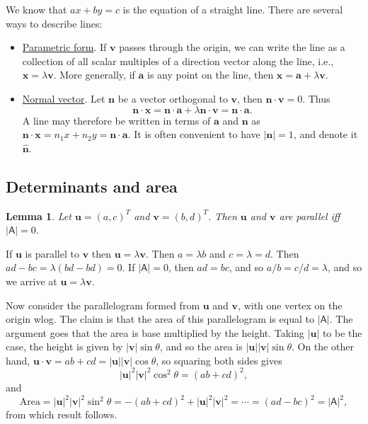 \documentclass[10pt,notitlepage]{revtex4-1}
\newtheorem{lemma}[theorem]{Lemma}
\newenvironment{proof}[1][Proof]{\begin{trivlist}
\item[\hskip \labelsep {\bfseries #1}]}{\end{trivlist}}
\newcommand{\xb}{\boldsymbol{x}}
\newcommand{\ub}{\boldsymbol{u}}
\newcommand{\vb}{\boldsymbol{v}}
\newcommand{\ab}{{\boldsymbol{a}}}
\newcommand{\nb}{{\boldsymbol{n}}}
\begin{document}
We know that $ax+by=c$ is the equation of a straight line. There are several
ways to describe lines:
\begin{itemize}
	\item \underline{Parametric form}. If $\vb$ passes through the origin, we
	can write the line as a collection of all scalar multiples of a direction
	vector along the line, i.e., $\xb=\lambda\vb$. More generally, if $\ab$ is
	any point on the line, then $\xb=\ab+\lambda\vb$.
	\item \underline{Normal vector}. Let $\nb$ be a vector orthogonal to $\vb$,
	then $\nb\cdot\vb=0$. Thus
	\begin{equation}
		\nb\cdot\xb=\nb\cdot\ab+\lambda\nb\cdot\vb = \nb\cdot\ab.
	\end{equation}
	A line may therefore be written in terms of $\ab$ and $\nb$ as
	$\nb\cdot\xb=n_1 x + n_2 y = \nb\cdot\ab$. It is often convenient to have
	$|\nb|=1$, and denote it $\hat{\nb}$.
\end{itemize}


\subsection{Determinants and area}

\begin{lemma}
	Let $\ub=(a,c)^{T}$ and $\vb=(b,d)^{T}$. Then $\ub$ and $\vb$ are parallel
	iff $|\mathsf{A}|=0$.
\end{lemma}
\begin{proof}
	If $\ub$ is parallel to $\vb$ then $\ub=\lambda\vb$. Then $a=\lambda b$ and
	$c=\lambda=d$. Then $ad-bc=\lambda(bd-bd)=0$. If $|\mathsf{A}|=0$, then
	$ad=bc$, and so $a/b=c/d=\lambda$, and so we arrive at $\ub=\lambda\vb$.
\end{proof}

Now consider the parallelogram formed from $\ub$ and $\vb$, with one vertex on
the origin wlog. The claim is that the area of this parallelogram is equal to
$|\mathsf{A}|$. The argument goes that the area is base multiplied by the
height. Taking $|\ub|$ to be the case, the height is given by $|\vb|\sin\theta$,
and so the area is $|\ub||\vb|\sin\theta$. On the other hand,
$\ub\cdot\vb=ab+cd=|\ub||\vb|\cos\theta$, so squaring both sides gives
\begin{equation}
	|\ub|^2 |\vb|^2 \cos^2\theta = (ab+cd)^2,
\end{equation}
and
\begin{equation}
	\mbox{Area}=|\ub|^2 |\vb|^2 \sin^2\theta = -(ab+cd)^2 + |\ub|^2 |\vb|^2
	=\cdots=(ad-bc)^2=|\mathsf{A}|^2,
\end{equation}
from which result follows.
\end{document}
